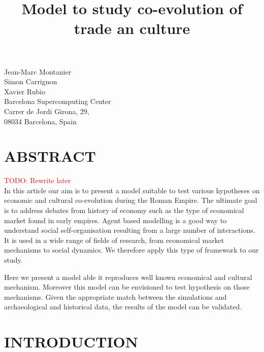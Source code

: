 \documentclass{wscpaperproc}
\newcommand{\memo}[2]{\textcolor{#1}{#2}}
\newcommand{\todo}[1]{\memo{red}{TODO: #1\\}}
\begin{document}

\title{Model to study co-evolution of trade an culture}


\begin{figure*}[htb]
{
\centering
Jean-Marc Montanier\\
Simon Carrignon\\ 
Xavier Rubio\\
\vspace{12pt}
Barcelona Supercomputing Center\\
Carrer de Jordi Girona, 29, \\
08034 Barcelona, Spain\\
}
\end{figure*}




\maketitle


\section*{ABSTRACT}

\todo{Rewrite later}
In this article our aim is to present a model suitable to test various hypotheses on economic and cultural co-evolution during the Roman Empire. The ultimate goal is to address debates from history of economy such as the type of economical market found in early empires. Agent based modelling is a good way to understand social self-organisation resulting from a large number of interactions. It is used in a wide range of fields of research, from economical market mechanisms to social dynamics. We therefore apply this type of framework to our study.

Here we present a model able it reproduces well known economical and cultural mechanism. Moreover this model can be envisioned to test hypothesis on those mechanisms. Given the appropriate match between the simulations and archaeological and historical data, the results of the model can be validated.


\section{INTRODUCTION}
\end{document}
